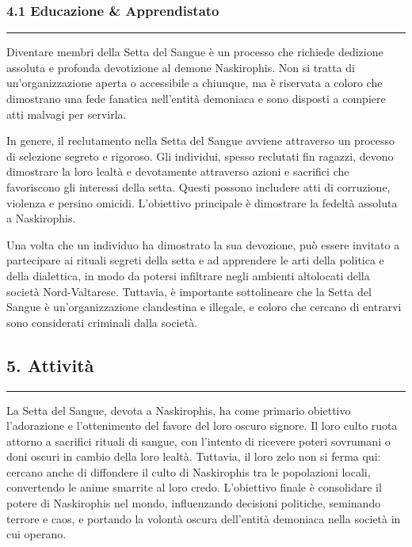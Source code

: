 \subsubsection{4.1 Educazione \&
Apprendistato}\label{educazione-apprendistato}

\begin{center}\rule{0.5\linewidth}{0.5pt}\end{center}

Diventare membri della Setta del Sangue è un processo che richiede
dedizione assoluta e profonda devotizione al demone Naskirophis. Non si
tratta di un'organizzazione aperta o accessibile a chiunque, ma è
riservata a coloro che dimostrano una fede fanatica nell'entità
demoniaca e sono disposti a compiere atti malvagi per servirla.

In genere, il reclutamento nella Setta del Sangue avviene attraverso un
processo di selezione segreto e rigoroso. Gli individui, spesso
reclutati fin ragazzi, devono dimostrare la loro lealtà e devotamente
attraverso azioni e sacrifici che favoriscono gli interessi della setta.
Questi possono includere atti di corruzione, violenza e persino omicidi.
L'obiettivo principale è dimostrare la fedeltà assoluta a Naskirophis.

Una volta che un individuo ha dimostrato la sua devozione, può essere
invitato a partecipare ai rituali segreti della setta e ad apprendere le
arti della politica e della dialettica, in modo da potersi infiltrare
negli ambienti altolocati della società Nord-Valtarese. Tuttavia, è
importante sottolineare che la Setta del Sangue è un'organizzazione
clandestina e illegale, e coloro che cercano di entrarvi sono
considerati criminali dalla società.

\subsection{5. Attività}\label{attivituxe0}

\begin{center}\rule{0.5\linewidth}{0.5pt}\end{center}

La Setta del Sangue, devota a Naskirophis, ha come primario obiettivo
l'adorazione e l'ottenimento del favore del loro oscuro signore. Il loro
culto ruota attorno a sacrifici rituali di sangue, con l'intento di
ricevere poteri sovrumani o doni oscuri in cambio della loro lealtà.
Tuttavia, il loro zelo non si ferma qui: cercano anche di diffondere il
culto di Naskirophis tra le popolazioni locali, convertendo le anime
smarrite al loro credo. L'obiettivo finale è consolidare il potere di
Naskirophis nel mondo, influenzando decisioni politiche, seminando
terrore e caos, e portando la volontà oscura dell'entità demoniaca nella
società in cui operano.
